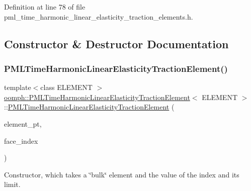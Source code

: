 Definition at line 78 of file pml\+\_\+time\+\_\+harmonic\+\_\+linear\+\_\+elasticity\+\_\+traction\+\_\+elements.\+h.



\subsection{Constructor \& Destructor Documentation}
\mbox{\label{classoomph_1_1PMLTimeHarmonicLinearElasticityTractionElement_a39560a5b7d4a7b5761cd1f85ee3333eb}} 
\subsubsection{\texorpdfstring{P\+M\+L\+Time\+Harmonic\+Linear\+Elasticity\+Traction\+Element()}{PMLTimeHarmonicLinearElasticityTractionElement()}}
{\footnotesize\ttfamily template$<$class E\+L\+E\+M\+E\+NT $>$ \\
\hyperlink{classoomph_1_1PMLTimeHarmonicLinearElasticityTractionElement}{oomph\+::\+P\+M\+L\+Time\+Harmonic\+Linear\+Elasticity\+Traction\+Element}$<$ E\+L\+E\+M\+E\+NT $>$\+::\hyperlink{classoomph_1_1PMLTimeHarmonicLinearElasticityTractionElement}{P\+M\+L\+Time\+Harmonic\+Linear\+Elasticity\+Traction\+Element} (\begin{DoxyParamCaption}\item[{\hyperlink{classoomph_1_1FiniteElement}{Finite\+Element} $\ast$const \&}]{element\+\_\+pt,  }\item[{const int \&}]{face\+\_\+index }\end{DoxyParamCaption})\hspace{0.3cm}{\ttfamily [inline]}}



Constructor, which takes a \char`\"{}bulk\char`\"{} element and the value of the index and its limit. 



